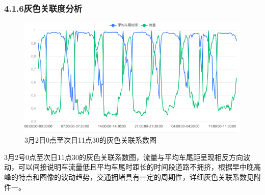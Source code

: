 \documentclass[UTF8]{article}
\begin{document}
         \subsubsection{4.1.6灰色关联度分析}
         \begin{figure}[H]
             \includegraphics[width=\linewidth]{11.png}
             \caption{3月2日0点至次日11点30的灰色关联系数图}
         \end{figure}
         3月2号0点至次日11点30的灰色关联系数图，流量与平均车尾距呈现相反方向波动，可以间接说明车流量低且平均车尾时距长的时间段道路不拥挤，根据早中晚高峰的特点和图像的波动趋势，交通拥堵具有一定的周期性，详细灰色关联系数见附件一。\\
         \begin{table}[H]
             \centering
         \end{table}



                
                        



     
            

    


    
\end{document}
